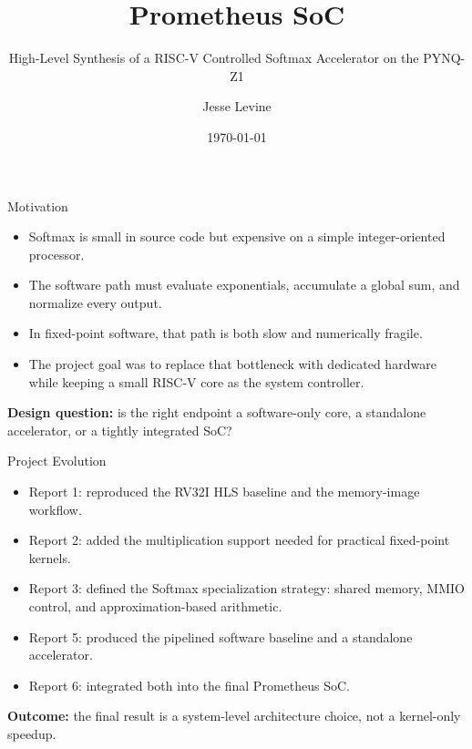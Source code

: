 \documentclass[aspectratio=169]{beamer}
\title{Prometheus SoC}
\subtitle{High-Level Synthesis of a RISC-V Controlled Softmax Accelerator on the PYNQ-Z1}
\author{Jesse Levine}
\institute{Department of Electronics, Carleton University}
\date{\today}
\begin{document}
\begin{frame}
  \titlepage
\end{frame}

\begin{frame}{Motivation}
\begin{itemize}
\item Softmax is small in source code but expensive on a simple integer-oriented processor.
\item The software path must evaluate exponentials, accumulate a global sum, and normalize every output.
\item In fixed-point software, that path is both slow and numerically fragile.
\item The project goal was to replace that bottleneck with dedicated hardware while keeping a small RISC-V core as the system controller.
\end{itemize}
\vspace{2mm}
\textbf{Design question:} is the right endpoint a software-only core, a standalone accelerator, or a tightly integrated SoC?
\end{frame}

\begin{frame}{Project Evolution}
\begin{itemize}
\item Report 1: reproduced the RV32I HLS baseline and the memory-image workflow.
\item Report 2: added the multiplication support needed for practical fixed-point kernels.
\item Report 3: defined the Softmax specialization strategy: shared memory, MMIO control, and approximation-based arithmetic.
\item Report 5: produced the pipelined software baseline and a standalone accelerator.
\item Report 6: integrated both into the final Prometheus SoC.
\end{itemize}
\vspace{2mm}
\textbf{Outcome:} the final result is a system-level architecture choice, not a kernel-only speedup.
\end{frame}
\end{document}

